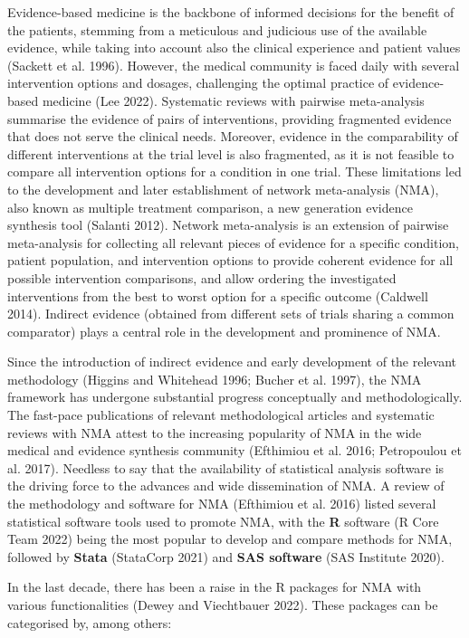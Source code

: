 Evidence-based medicine is the backbone of informed decisions for the benefit of
the patients, stemming from a meticulous and judicious use of the available evidence,
while taking into account also the clinical experience and patient values (Sackett et al. 1996).
However, the medical community is faced daily with several intervention options and
dosages, challenging the optimal practice of evidence-based medicine (Lee 2022).
Systematic reviews with pairwise meta-analysis summarise the evidence of pairs of
interventions, providing fragmented evidence that does not serve the clinical needs.
Moreover, evidence in the comparability of different interventions at the trial
level is also fragmented, as it is not feasible to compare all intervention options
for a condition in one trial. These limitations led to the development and later
establishment of network meta-analysis (NMA), also known as multiple treatment
comparison, a new generation evidence synthesis tool (Salanti 2012). Network
meta-analysis is an extension of pairwise meta-analysis for collecting all relevant
pieces of evidence for a specific condition, patient population, and intervention
options to provide coherent evidence for all possible intervention comparisons,
and allow ordering the investigated interventions from the best to worst option
for a specific outcome (Caldwell 2014). Indirect evidence (obtained from different
sets of trials sharing a common comparator) plays a central role in the development
and prominence of NMA.

Since the introduction of indirect evidence and early development of the relevant
methodology (Higgins and Whitehead 1996; Bucher et al. 1997), the NMA framework has undergone substantial
progress conceptually and methodologically. The fast-pace publications of relevant
methodological articles and systematic reviews with NMA attest to the increasing
popularity of NMA in the wide medical and evidence synthesis community
(Efthimiou et al. 2016; Petropoulou et al. 2017). Needless to say that the availability of statistical
analysis software is the driving force to the advances and wide dissemination of NMA.
A review of the methodology and software for NMA (Efthimiou et al. 2016) listed several statistical
software tools used to promote NMA, with the \textbf{R} software (R Core Team 2022) being the most
popular to develop and compare methods for NMA, followed by \textbf{Stata} (StataCorp 2021) and
\textbf{SAS software} (SAS Institute 2020).

In the last decade, there has been a raise in the R packages for NMA with various
functionalities (Dewey and Viechtbauer 2022). These packages can be categorised by, among
others:

